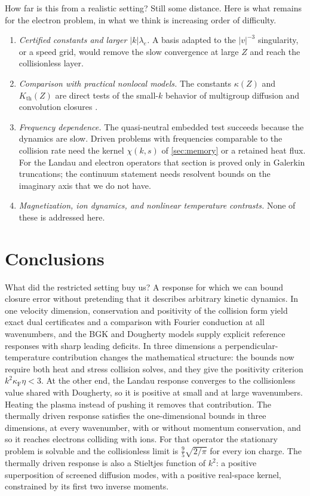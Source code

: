 \documentclass[11pt]{article}
\newcommand{\F}{\kappa_{\mathrm F}}
\newcommand{\kap}{\kappa}
\newcommand{\thr}{\mathrm{th}}
\theoremstyle{definition}
\theoremstyle{remark}
\numberwithin{equation}{section}
\begin{document}
How far is this from a realistic setting? Still some distance. Here is
what remains for the electron problem, in what we think is increasing
order of difficulty.
\begin{enumerate}
\item \emph{Certified constants and larger $|k|\lambda_e$.} A basis
adapted to the $|v|^{-3}$ singularity, or a speed grid, would remove the
slow convergence at large $Z$ and reach the collisionless layer.
\item \emph{Comparison with practical nonlocal models.} The constants
$\kap(Z)$ and $K_\thr(Z)$ are direct tests of the small-$k$ behavior of
multigroup diffusion and convolution closures
\cite{LMV1983,EpperleinShort1991,Brodrick2017}.
\item \emph{Frequency dependence.} The quasi-neutral embedded test
succeeds because the dynamics are slow. Driven problems with frequencies
comparable to the collision rate need the kernel $\chi(k,s)$ of
\cref{sec:memory} or a retained heat flux. For the Landau and electron
operators that section is proved only in Galerkin truncations; the
continuum statement needs resolvent bounds on the imaginary axis that we
do not have.
\item \emph{Magnetization, ion dynamics, and nonlinear temperature
contrasts.} None of these is addressed here.
\end{enumerate}

\section{Conclusions}

What did the restricted setting buy us? A response for which we can
bound closure error without pretending that it describes arbitrary
kinetic dynamics. In one velocity dimension, conservation and positivity
of the collision form yield exact dual certificates and a comparison
with Fourier conduction at all wavenumbers, and the BGK and Dougherty
models supply explicit reference responses with sharp leading deficits.
In three dimensions a perpendicular-temperature contribution changes the
mathematical structure: the bounds now require both heat and stress
collision solves, and they give the positivity criterion
$k^2\F\eta<3$. At the other end, the Landau response converges to the
collisionless value shared with Dougherty, so it is positive at small
and at large wavenumbers. Heating the plasma instead of pushing it removes that
contribution. The thermally driven response satisfies the
one-dimensional bounds in three dimensions, at every wavenumber, with or
without momentum conservation, and so it reaches electrons colliding
with ions. For that operator the stationary problem is solvable and the
collisionless limit is $\tfrac95\sqrt{2/\pi}$ for every ion charge. The
thermally driven response is also a Stieltjes function of $k^2$: a
positive superposition of screened diffusion modes, with a positive
real-space kernel, constrained by its first two inverse moments.
\end{document}
